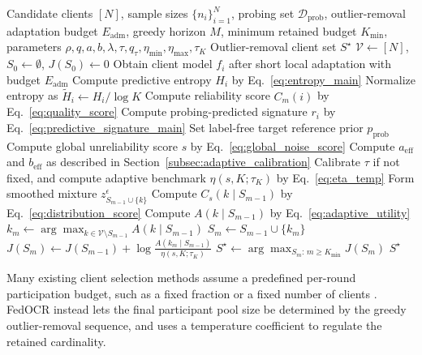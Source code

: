 ﻿\documentclass[conference]{IEEEtran}
\theoremstyle{definition}
\theoremstyle{remark}
\begin{document}
\begin{algorithm}[t]
\caption{FedOCR: Fixed-Scale Noise-Adaptive Client-Block Outlier Removal}
\label{alg:FedOCR}
\begin{algorithmic}[1]
\Require Candidate clients $[N]$, sample sizes $\{n_i\}_{i=1}^N$, probing set $\mathcal D_{\mathrm{prob}}$, outlier-removal adaptation budget $E_{\mathrm{adm}}$, greedy horizon $M$, minimum retained budget $K_{\min}$, parameters $\rho,q,a,b,\lambda,\tau,q_\tau,\eta_{\min},\eta_{\max},\tau_K$
\Ensure Outlier-removal client set $S^\star$
\State $\mathcal V\leftarrow[N]$, $S_0\leftarrow\emptyset$, $J(S_0)\leftarrow0$
    \State Obtain client model $f_i$ after short local adaptation with budget $E_{\mathrm{adm}}$
    \State Compute predictive entropy $H_i$ by Eq.~\eqref{eq:entropy_main}
    \State Normalize entropy as $\widetilde H_i\leftarrow H_i/\log K$
    \State Compute reliability score $C_m(i)$ by Eq.~\eqref{eq:quality_score}
    \State Compute probing-predicted signature $r_i$ by Eq.~\eqref{eq:predictive_signature_main}
\EndFor
\State Set label-free target reference prior $p_{\mathrm{prob}}$
\State Compute global unreliability score $s$ by Eq.~\eqref{eq:global_noise_score}
\State Compute $a_{\mathrm{eff}}$ and $b_{\mathrm{eff}}$ as described in Section~\ref{subsec:adaptive_calibration}
\State Calibrate $\tau$ if not fixed, and compute adaptive benchmark $\eta(s,K;\tau_K)$ by Eq.~\eqref{eq:eta_temp}
        \State Form smoothed mixture $z_{S_{m-1}\cup\{k\}}^\epsilon$
        \State Compute $C_s(k\mid S_{m-1})$ by Eq.~\eqref{eq:distribution_score}
        \State Compute $A(k\mid S_{m-1})$ by Eq.~\eqref{eq:adaptive_utility}
    \EndFor
    \State $k_m\leftarrow\arg\max_{k\in\mathcal V\setminus S_{m-1}}A(k\mid S_{m-1})$
    \State $S_m\leftarrow S_{m-1}\cup\{k_m\}$
    \State $J(S_m)\leftarrow J(S_{m-1})+\log\frac{A(k_m\mid S_{m-1})}{\eta(s,K;\tau_K)}$
\EndFor
\State $S^\star\leftarrow \arg\max_{S_m:\,m\ge K_{\min}}J(S_m)$
\State \Return $S^\star$
\end{algorithmic}
\end{algorithm}

Many existing client selection methods assume a predefined per-round participation budget, such as a fixed fraction or a fixed number of clients
\cite{mcmahan2017communication, lai2021oort, cho2022power}.
FedOCR instead lets the final participant pool size be determined by the greedy outlier-removal sequence, and uses a temperature coefficient to regulate the retained cardinality.
\end{document}
